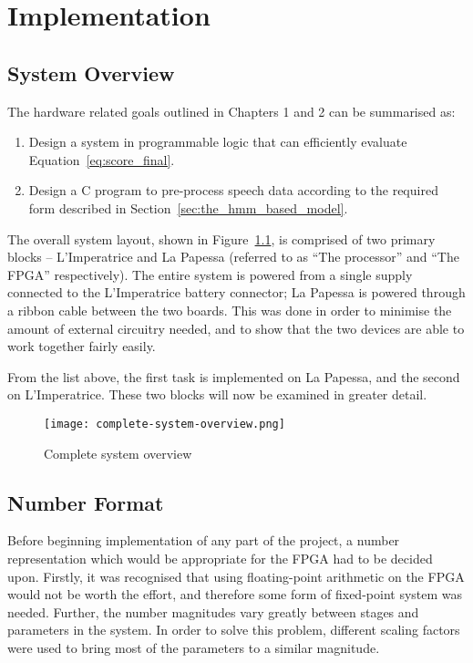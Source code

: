 \chapter{Implementation} %
\label{cha:system_design}

\section{System Overview} %
\label{sec:system_overview}
	The hardware related goals outlined in Chapters 1 and 2 can be summarised as:
	\begin{enumerate}
		\item Design a system in programmable logic that can efficiently evaluate Equation~\ref{eq:score_final}.
		\item Design a C program to pre-process speech data according to the required form described in Section~\ref{sec:the_hmm_based_model}.
	\end{enumerate}

	The overall system layout, shown in Figure~\ref{fig:hlsystem}, is comprised of two primary blocks -- L'Imperatrice and La Papessa (referred to as ``The processor'' and ``The FPGA'' respectively).  
	The entire system is powered from a single supply connected to the L'Imperatrice battery connector; La Papessa is powered through a ribbon cable between the two boards.  This was done in order to minimise the amount of external circuitry needed, and to show that the two devices are able to work together fairly easily.

	From the list above, the first task is implemented on La Papessa, and the second on L'Imperatrice.  These two blocks will now be examined in greater detail.



	\begin{figure}[tb]
		\begin{center}
			\texttt{[image: complete-system-overview.png]}
		\end{center}
		\caption{Complete system overview}
		\label{fig:hlsystem}
	\end{figure}


\section{Number Format} %
\label{sec:number_format}
	Before beginning implementation of any part of the project, a number representation which would be appropriate for the FPGA had to be decided upon.  Firstly, it was recognised that using floating-point arithmetic on the FPGA would not be worth the effort, and therefore some form of fixed-point system was needed.  Further, the number magnitudes vary greatly between stages and parameters in the system.  In order to solve this problem, different scaling factors were used to bring most of the parameters to a similar magnitude.  


